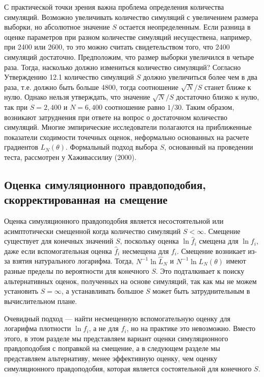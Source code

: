 С практической точки зрения важна проблема определения количества симуляций. Возможно увеличивать количество симуляций с увеличением размера выборки, но абсолютное значение $S$ остается неопределенным. Если разница в оценке параметров при разном количестве симуляций несуществена, например, при 2400 или 2600, то это можно считать свидетельством того, что 2400 симуляций достаточно. Предположим, что размер выборки увеличился в четыре раза. Тогда, насколько должно измениться количество симуляций? Согласно Утверждению 12.1 количество симуляций $S$ должно увеличиться более чем в два раза, т.е. должно быть больше 4800, тогда соотношение $\sqrt{N}/S$ станет ближе к нулю. Однако нельзя утверждать, что значение $\sqrt{N}/S$ достаточно близко к нулю, так при $S=2,400$ и $N=6,400$ соотношение равно $1/30$. Таким образом, возникают затруднения при ответе на вопрос о достаточном количество симуляций. Многие эмпирические исследователи полагаются на приближенные показатели сходимости точечных оценок, неформально основанных на расчете градиентов $L_N(\theta)$. Формальный подход выбора $S$, основанный на проведении теста, рассмотрен у Хаживассилиу (2000). 

\subsection{Оценка симуляционного правдоподобия, скорректированная на смещение}

Оценка симуляционного правдоподобия является несостоятельной или асимптотически смещенной когда количество симуляций $S<{\infty}$. Смещение существует для конечных значений $S$, поскольку оценка $\ln{\hat{f}_i}$ смещена для $\ln{f_i}$, даже если вспомогательная оценка $\hat{f}_i$ несмещена для $f_i$. Смещение возникает из-за взятия натурального логарифма. Тогда, $N^{-1}\ln{\hat{L}_N}$ и $N^{-1}\ln{L_N}(\theta)$ имеют разные пределы по вероятности для конечного $S$. Это подталкивает к поиску альтернативных оценок, полученных на основе симуляций, так как мы не можем установить $S = \infty$, а устанавливать большое $S$ может быть затруднительным в вычислительном плане.

Очевидный подход --- найти несмещенную вспомогательную оценку для логарифма плотности $\ln f_i$, а не для $f_i$, но на практике это невозможно. Вместо этого, в этом разделе мы представляем вариант оценки симуляционного правдоподобия с поправкой на смещение, а в следующем разделе мы представляем альтернативу, менее эффективную оценку, чем оценку симуляционного правдоподобия, которая является состоятельной для конечного $S$.

